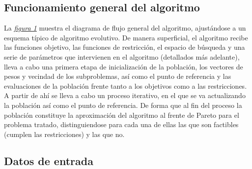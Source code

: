 \subsection{Funcionamiento general del algoritmo}


La \hyperref[fig:1]{\textit{figura 1}} muestra el diagrama de flujo general del algoritmo, ajustándose a un esquema típico de algoritmo evolutivo. De manera superficial, el algoritmo recibe las funciones objetivo, las funciones de restricción, el espacio de búsqueda y una serie de parámetros que intervienen en el algoritmo (detallados más adelante), lleva a cabo una primera etapa de inicialización de la población, los vectores de pesos y vecindad de los subproblemas, así como el punto de referencia y las evaluaciones de la población frente tanto a los objetivos como a las restricciones. A partir de ahí se lleva a cabo un proceso iterativo, en el que se va actualizando la población así como el punto de referencia. De forma que al fin del proceso la población constituye la aproximación del algoritmo al frente de Pareto para el problema tratado, distinguiendose para cada una de ellas las que son factibles (cumplen las restricciones) y las que no.\\


\subsection{Datos de entrada}

